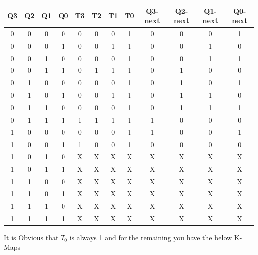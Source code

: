 \documentclass[a4paper,12pt]{article}
\begin{document}
\begin{table}[H]
        \begin{tabular}{|c|c|c|c|c|c|c|c|c|c|c|c|}
                \hline
		\textbf{Q3} & \textbf{Q2} & \textbf{Q1} & \textbf{Q0} & \textbf{T3} & \textbf{T2} & \textbf{T1} & \textbf{T0} & \textbf{Q3-next} & \textbf{Q2-next} & \textbf{Q1-next} & \textbf{Q0-next} \\
                \hline
		0 & 0 & 0 & 0 & 0 & 0 & 0 & 1 & 0 & 0 & 0 & 1 \\
                \hline
		0 & 0 & 0 & 1 & 0 & 0 & 1 & 1 & 0 & 0 & 1 & 0 \\
		\hline
		0 & 0 & 1 & 0 & 0 & 0 & 0 & 1 & 0 & 0 & 1 & 1 \\
		\hline
		0 & 0 & 1 & 1 & 0 & 1 & 1 & 1 & 0 & 1 & 0 & 0 \\
		\hline
		0 & 1 & 0 & 0 & 0 & 0 & 0 & 1 & 0 & 1 & 0 & 1 \\
		\hline
		0 & 1 & 0 & 1 & 0 & 0 & 1 & 1 & 0 & 1 & 1 & 0 \\
		\hline
		0 & 1 & 1 & 0 & 0 & 0 & 0 & 1 & 0 & 1 & 1 & 1 \\
		\hline
		0 & 1 & 1 & 1 & 1 & 1 & 1 & 1 & 1 & 0 & 0 & 0 \\
		\hline
		1 & 0 & 0 & 0 & 0 & 0 & 0 & 1 & 1 & 0 & 0 & 1 \\
		\hline
		1 & 0 & 0 & 1 & 1 & 0 & 0 & 1 & 0 & 0 & 0 & 0 \\
		\hline
		1 & 0 & 1 & 0 & X & X & X & X & X & X & X & X \\
		\hline
		1 & 0 & 1 & 1 & X & X & X & X & X & X & X & X \\
		\hline
		1 & 1 & 0 & 0 & X & X & X & X & X & X & X & X \\
		\hline
		1 & 1 & 0 & 1 & X & X & X & X & X & X & X & X \\
		\hline
		1 & 1 & 1 & 0 & X & X & X & X & X & X & X & X \\
		\hline
		1 & 1 & 1 & 1 & X & X & X & X & X & X & X & X \\
		\hline
        \end{tabular}
\end{table}
It is Obvious that $T_0$ is always 1 and for the remaining you have the below K-Maps
\end{document}
